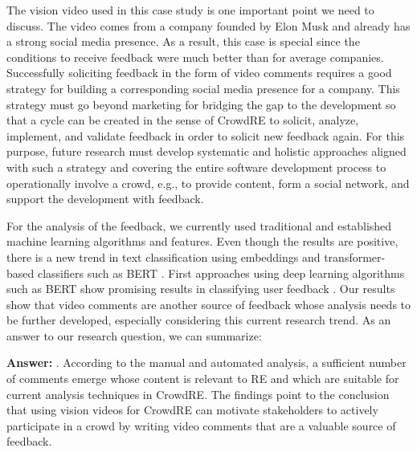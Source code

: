\documentclass[conference]{IEEEtran}
\begin{document}
{The vision video used in this case study is one important point we need to discuss. The video comes from a company founded by Elon Musk and already has a strong social media presence. As a result, this case is special since the conditions to receive feedback were much better than for average companies. Successfully soliciting feedback in the form of video comments requires a good strategy for building a corresponding social media presence for a company. This strategy must go beyond marketing for bridging the gap to the development so that a cycle can be created in the sense of CrowdRE to solicit, analyze, implement, and validate feedback in order to solicit new feedback again. For this purpose, future research must develop systematic and holistic approaches aligned with such a strategy and covering the entire software development process to operationally involve a crowd, e.g., to provide content, form a social network, and support the development with feedback.

For the analysis of the feedback, we currently used traditional and established machine learning algorithms and features. Even though the results are positive, there is a new trend in text classification using embeddings and transformer-based classifiers such as BERT \cite{Devlin.2018}. First approaches using deep learning algorithms such as BERT show promising results in classifying user feedback \cite{Reddy.2021}. Our results show that video comments are another source of feedback whose analysis needs to be further developed, especially considering this current research trend. As an answer to our research question, we can summarize:

\begin{mdframed}
	\textbf{Answer:} . According to the manual and automated analysis, a sufficient number of comments emerge whose content is relevant to RE and which are suitable for current analysis techniques in CrowdRE. The findings point to the conclusion that using vision videos for CrowdRE can motivate stakeholders to actively participate in a crowd by writing video comments that are a valuable source of feedback.
\end{mdframed}

}
\end{document}
